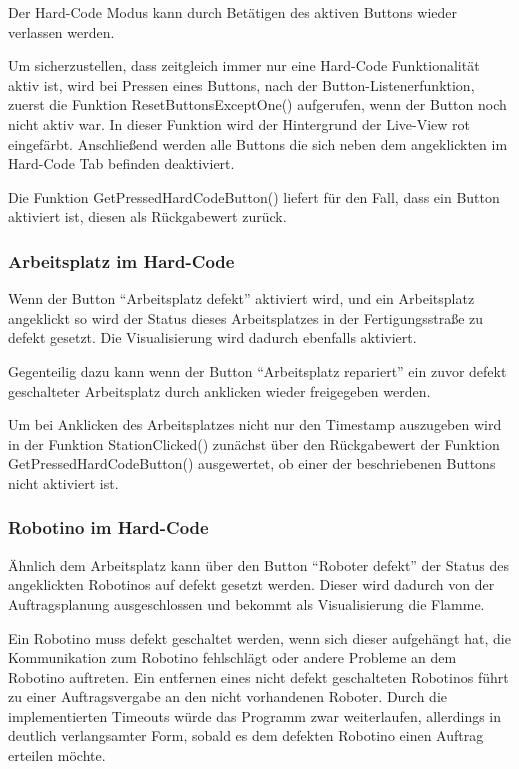 Der Hard-Code Modus kann durch Betätigen des aktiven Buttons wieder verlassen werden. 

Um sicherzustellen, dass zeitgleich immer nur eine Hard-Code Funktionalität aktiv ist, wird bei Pressen eines Buttons, nach der Button-Listenerfunktion, zuerst die Funktion ResetButtonsExceptOne() aufgerufen, wenn der Button noch nicht aktiv war. In dieser Funktion wird der Hintergrund der Live-View rot eingefärbt. Anschließend werden alle Buttons die sich neben dem angeklickten im Hard-Code Tab befinden deaktiviert. 

Die Funktion GetPressedHardCodeButton() liefert für den Fall, dass ein Button aktiviert ist, diesen als Rückgabewert zurück. 

\subsubsection{Arbeitsplatz im Hard-Code}

Wenn der Button "`Arbeitsplatz defekt"' aktiviert wird, und ein Arbeitsplatz angeklickt so wird der Status dieses Arbeitsplatzes in der Fertigungsstraße zu defekt gesetzt. Die Visualisierung wird dadurch ebenfalls aktiviert. 

Gegenteilig dazu kann wenn der Button "`Arbeitsplatz repariert"' ein zuvor defekt geschalteter Arbeitsplatz durch anklicken wieder freigegeben werden. 

Um bei Anklicken des Arbeitsplatzes nicht nur den Timestamp auszugeben wird in der Funktion StationClicked() zunächst über den Rückgabewert der Funktion GetPressedHardCodeButton() ausgewertet, ob einer der beschriebenen Buttons nicht aktiviert ist. 

\subsubsection{Robotino im Hard-Code}

Ähnlich dem Arbeitsplatz kann über den Button "`Roboter defekt"' der Status des angeklickten Robotinos auf defekt gesetzt werden. Dieser wird dadurch von der Auftragsplanung ausgeschlossen und bekommt als Visualisierung die Flamme. 

Ein Robotino muss defekt geschaltet werden, wenn sich dieser aufgehängt hat, die Kommunikation zum Robotino fehlschlägt oder andere Probleme an dem Robotino auftreten. Ein entfernen eines nicht defekt geschalteten Robotinos führt zu einer Auftragsvergabe an den nicht vorhandenen Roboter. Durch die implementierten Timeouts würde das Programm zwar weiterlaufen, allerdings in deutlich verlangsamter Form, sobald es dem defekten Robotino einen Auftrag erteilen möchte. 

